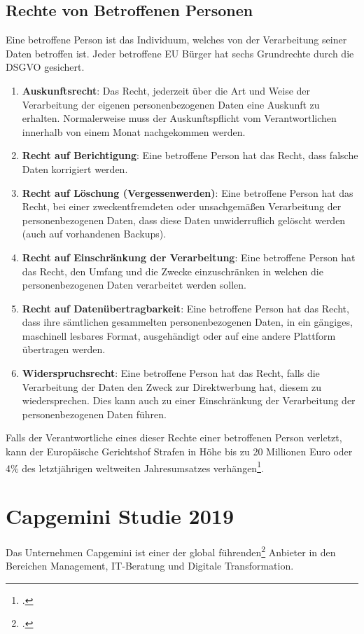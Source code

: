 \subsection{Rechte von Betroffenen Personen}
Eine betroffene Person ist das Individuum, welches von der Verarbeitung seiner Daten betroffen ist.
Jeder betroffene EU Bürger hat sechs Grundrechte durch die DSGVO gesichert.
\begin{enumerate}
    \item \textbf{Auskunftsrecht}: Das Recht, jederzeit über die Art und Weise der Verarbeitung der eigenen personenbezogenen Daten eine Auskunft zu erhalten. Normalerweise muss der Auskunftspflicht vom Verantwortlichen innerhalb von einem Monat nachgekommen werden.
    \item \textbf{Recht auf Berichtigung}: Eine betroffene Person hat das Recht, dass falsche Daten korrigiert werden.
    \item \textbf{Recht auf Löschung (Vergessenwerden)}: Eine betroffene Person hat das Recht, bei einer zweckentfremdeten oder unsachgemäßen Verarbeitung der personenbezogenen Daten, dass diese Daten unwiderruflich gelöscht werden (auch auf vorhandenen Backups).
    \item \textbf{Recht auf Einschränkung der Verarbeitung}: Eine betroffene Person hat das Recht, den Umfang und die Zwecke einzuschränken in welchen die personenbezogenen Daten verarbeitet werden sollen.
    \item \textbf{Recht auf Datenübertragbarkeit}: Eine betroffene Person hat das Recht, dass ihre sämtlichen gesammelten personenbezogenen Daten, in ein gängiges, maschinell lesbares Format, ausgehändigt oder auf eine andere Plattform übertragen werden.
    \item \textbf{Widerspruchsrecht}: Eine betroffene Person hat das Recht, falls die Verarbeitung der Daten den Zweck zur Direktwerbung hat, diesem zu wiedersprechen. Dies kann auch zu einer Einschränkung der Verarbeitung der personenbezogenen Daten führen.
\end{enumerate}
Falls der Verantwortliche eines dieser Rechte einer betroffenen Person verletzt,
kann der Europäische Gerichtshof Strafen in Höhe bis zu 20 Millionen Euro oder 4\% des letztjährigen weltweiten Jahresumsatzes verhängen\footcite{Lehrunterlagen-HTL-cloud}.
\section{Capgemini Studie 2019}
Das Unternehmen Capgemini ist einer der global führenden\footcite{capgem-cap} Anbieter in den Bereichen Management, IT-Beratung und Digitale Transformation.

